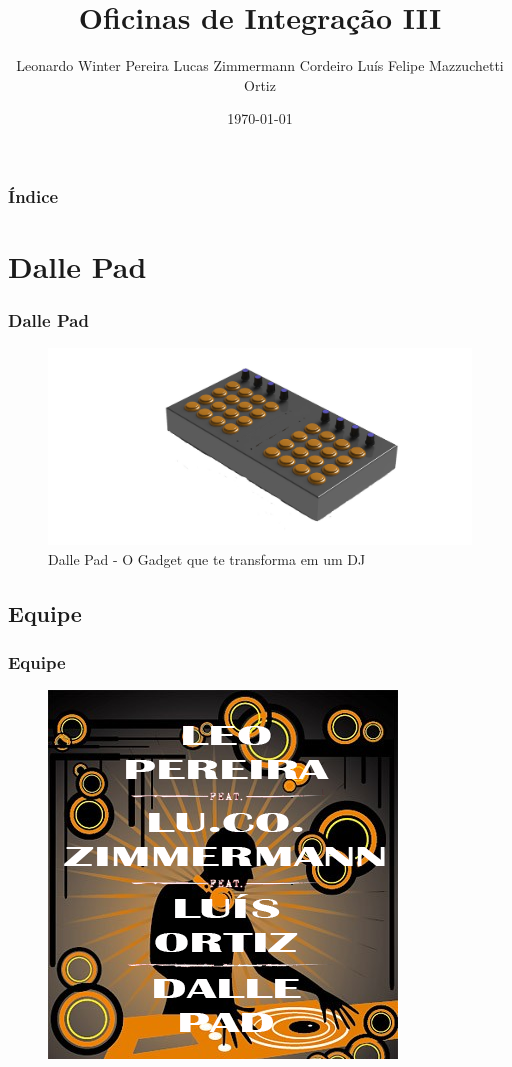\documentclass[hyperref={pdfpagelabels=false}]{beamer}
\title{Oficinas de Integração III}
\author{Leonardo Winter Pereira \newline Lucas Zimmermann Cordeiro \newline Luís Felipe Mazzuchetti Ortiz}
\date{\today}
\begin{document}
    \begin{frame}
    \titlepage
    \end{frame}

    \begin{frame}\frametitle{Índice}
        \tableofcontents
    \end{frame}

    \section{Dalle Pad}

        \begin{frame}\frametitle{Dalle Pad}

            \begin{figure}
                    \includegraphics[scale=0.15]{Imagens/DallePad360.jpg}
                    \caption{Dalle Pad - O Gadget que te transforma em um DJ}
            \end{figure}

        \end{frame}

        \subsection{Equipe}

            \begin{frame}\frametitle{Equipe}

                \begin{figure}
                    \includegraphics[scale=0.5]{Imagens/Equipe.png}
                \end{figure}

            \end{frame}
            
\end{document}

